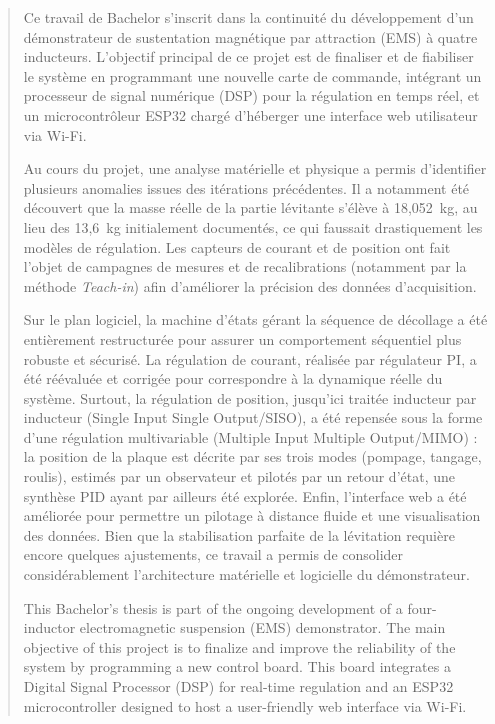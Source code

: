 \begin{abstract}

    Ce travail de Bachelor s'inscrit dans la continuité du développement d'un démonstrateur de sustentation magnétique par attraction (EMS) à quatre inducteurs. L'objectif principal de ce projet est de finaliser et de fiabiliser le système en programmant une nouvelle carte de commande, intégrant un processeur de signal numérique (DSP) pour la régulation en temps réel, et un microcontrôleur ESP32 chargé d'héberger une interface web utilisateur via Wi-Fi.

    Au cours du projet, une analyse matérielle et physique a permis d'identifier plusieurs anomalies issues des itérations précédentes. Il a notamment été découvert que la masse réelle de la partie lévitante s'élève à 18,052~kg, au lieu des 13,6~kg initialement documentés, ce qui faussait drastiquement les modèles de régulation. Les capteurs de courant et de position ont fait l'objet de campagnes de mesures et de recalibrations (notamment par la méthode \textit{Teach-in}) afin d'améliorer la précision des données d'acquisition.

    Sur le plan logiciel, la machine d'états gérant la séquence de décollage a été entièrement restructurée pour assurer un comportement séquentiel plus robuste et sécurisé. La régulation de courant, réalisée par régulateur PI, a été réévaluée et corrigée pour correspondre à la dynamique réelle du système. Surtout, la régulation de position, jusqu'ici traitée inducteur par inducteur (Single Input Single Output/SISO), a été repensée sous la forme d'une régulation multivariable (Multiple Input Multiple Output/MIMO) : la position de la plaque est décrite par ses trois modes (pompage, tangage, roulis), estimés par un observateur et pilotés par un retour d'état, une synthèse PID ayant par ailleurs été explorée. Enfin, l'interface web a été améliorée pour permettre un pilotage à distance fluide et une visualisation des données. Bien que la stabilisation parfaite de la lévitation requière encore quelques ajustements, ce travail a permis de consolider considérablement l'architecture matérielle et logicielle du démonstrateur.

    \asterism

    This Bachelor's thesis is part of the ongoing development of a four-inductor electromagnetic suspension (EMS) demonstrator. The main objective of this project is to finalize and improve the reliability of the system by programming a new control board. This board integrates a Digital Signal Processor (DSP) for real-time regulation and an ESP32 microcontroller designed to host a user-friendly web interface via Wi-Fi.


\end{abstract}
